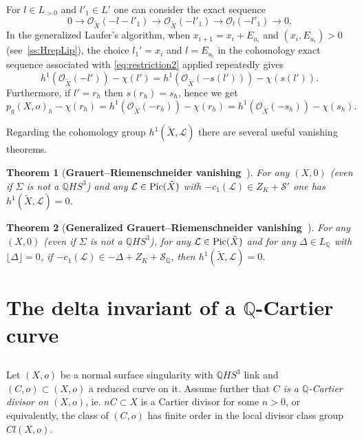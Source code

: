 \documentclass[12pt,a4paper]{amsart}
\def\cS{{\mathcal S}}
\def\QQ{\mathbb{Q}}
\def\cO{\mathcal{O}}
\newtheorem{thm}{Theorem}[section]  %
\theoremstyle{remark}
\theoremstyle{definition}
\begin{document}
For  $l\in L_{>0}$ and $l'_1\in L'$ one can consider the exact sequence 
\begin{equation}
\label{eq:restriction2}
0\to \cO_{\tilde X}(-l-l'_1)\to \cO_{\tilde X}(-l'_1)\to \cO_{l}(-l'_1)\to 0.
\end{equation}
In the  generalized Laufer's algorithm, when  $x_{i+1}=x_i+E_{u_i}$
and  $(x_i,E_{u_i})>0$ (see~\ref{ss:HrepLip}), the choice $l_1'=x_i$ and $l=E_{u_i}$ in the cohomology exact sequence associated with \eqref{eq:restriction2}  applied  repeatedly gives
\begin{equation}\label{eq:sell'}
h^1(\cO_{{\tilde X}}(-l'))-\chi(l')=h^1(\cO_{{\tilde X}}(-s(l')))-\chi(s(l')).
\end{equation}
Furthermore, if $l'=r_h$ then $s(r_h)=s_h$, hence we get 
\begin{equation}\label{eq:rhsh}
p_g(X,o)_{h}-\chi(r_h)=
h^1(\cO_{{\tilde X}}(-r_h))-\chi(r_h)=h^1(\cO_{{\tilde X}}(-s_h))-\chi(s_h).
\end{equation}

Regarding the cohomology group $h^1({\tilde X}, {\mathcal L})$ there are several
 useful vanishing theorems.

\begin{thm}[\textbf{Grauert--Riemenschneider vanishing~\cite{GrRie,Laufer-rational,Ram}}]
\label{thm:GR}
For any $(X,0)$ (even if $\Sigma$ is not a $\mathbb{Q}HS^3$) and
 any $\mathcal L\in {\rm Pic}(\tilde X)$ with
$-c_1({\mathcal L})\in Z_K+ \cS'$ one has $h^1({\tilde X},{\mathcal L})=0$.
\end{thm}

\begin{thm}[\textbf{Generalized Grauert--Riemenschneider vanishing~\cite{EFBook}}]
\label{thm:GGR}  For any $(X,0)$ (even if $\Sigma$ is not a $\mathbb{Q}HS^3$),
 for any $\mathcal L\in {\rm Pic}(\tilde X)$ and for any $\Delta \in L_{\mathbb{Q}}$ with
 $\lfloor \Delta \rfloor=0$, if
$-c_1({\mathcal L})\in -\Delta + Z_K+ \cS_{\QQ}$, then $h^1({\tilde X},{\mathcal L})=0$.
\end{thm}


\section{The delta invariant of a $\mathbb{Q}$-Cartier curve}

\subsection{} Let $(X,o)$ be a normal surface singularity with $\mathbb{Q}HS^3$ link and $(C,o)\subset (X,o)$ a reduced curve on it. Assume further that \emph{$C$ is a $\mathbb{Q}$-Cartier divisor on $(X,o)$}, ie. $nC\subset X$ is a Cartier divisor for some $n>0$, or equivalently, the  class of $(C,o)$  has finite order in the local divisor class group $Cl(X,o)$. 
\end{document}

